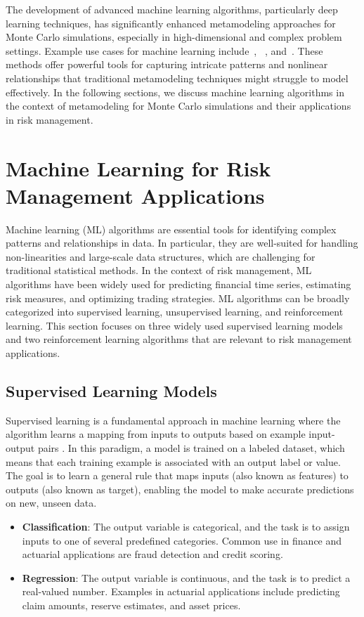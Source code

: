 The development of advanced machine learning algorithms, particularly deep learning techniques, has significantly enhanced metamodeling approaches for Monte Carlo simulations, especially in high-dimensional and complex problem settings.
Example use cases for machine learning include~\cite{jin2020deep}, ~\cite{tang2020deep}, and~\cite{rosen2012metamodeling}.
These methods offer powerful tools for capturing intricate patterns and nonlinear relationships that traditional metamodeling techniques might struggle to model effectively.
In the following sections, we discuss machine learning algorithms in the context of metamodeling for Monte Carlo simulations and their applications in risk management.

\section{Machine Learning for Risk Management Applications}

Machine learning (ML) algorithms are essential tools for identifying complex patterns and relationships in data. 
In particular, they are well-suited for handling non-linearities and large-scale data structures, which are challenging for traditional statistical methods. 
In the context of risk management, ML algorithms have been widely used for predicting financial time series, estimating risk measures, and optimizing trading strategies.
ML algorithms can be broadly categorized into supervised learning, unsupervised learning, and reinforcement learning.
This section focuses on three widely used supervised learning models and two reinforcement learning algorithms that are relevant to risk management applications.

\subsection{Supervised Learning Models}

Supervised learning is a fundamental approach in machine learning where the algorithm learns a mapping from inputs to outputs based on example input-output pairs \cite{galton1886regression}. 
In this paradigm, a model is trained on a labeled dataset, which means that each training example is associated with an output label or value. 
The goal is to learn a general rule that maps inputs (also known as features) to outputs (also known as target), enabling the model to make accurate predictions on new, unseen data.

\begin{itemize} 
    \item \textbf{Classification}: The output variable is categorical, and the task is to assign inputs to one of several predefined categories. 
    Common use in finance and actuarial applications are fraud detection and credit scoring.
    \item \textbf{Regression}: The output variable is continuous, and the task is to predict a real-valued number. 
    Examples in actuarial applications include predicting claim amounts, reserve estimates, and asset prices.
\end{itemize}

